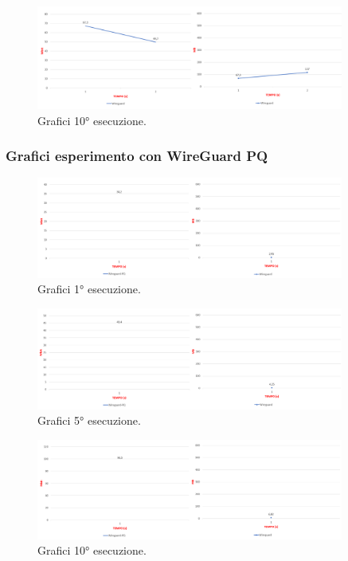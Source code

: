 \begin{figure}[h] \includegraphics[width=0.9\textwidth] {Tesi magistrale/capitoli/images/6.png}
\centering
\caption{Grafici 10° esecuzione.}
\end{figure}

\newpage
\subsubsection{Grafici esperimento con WireGuard PQ}

\begin{figure}[h] \includegraphics[width=0.9\textwidth] {Tesi magistrale/capitoli/images/7.png}
\centering
\caption{Grafici 1° esecuzione.}
\end{figure}

\begin{figure}[h] \includegraphics[width=0.9\textwidth] {Tesi magistrale/capitoli/images/8.png}
\centering
\caption{Grafici 5° esecuzione.}
\end{figure}

\begin{figure}[h] \includegraphics[width=0.9\textwidth] {Tesi magistrale/capitoli/images/9.png}
\centering
\caption{Grafici 10° esecuzione.}
\end{figure}

